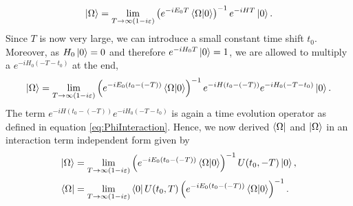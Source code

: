 \begin{equation}
    \ket{\Omega} = \lim_{T\to \infty(1-i\varepsilon)} \left( e^{-iE_0T}\braket{\Omega | 0} \right)^{-1} e^{-iHT} \ket{0}.
\end{equation}
Since $T$ is now very large, we can introduce a small constant time shift $t_0$. Moreover, as $H_0 \ket{0} = 0$ and therefore $e^{-iH_0T} \ket{0} = 1$,  we are allowed to multiply a $e^{-iH_0(-T-t_0)}$ at the end,
\begin{equation}
    \ket{\Omega} = \lim_{T\to \infty(1-i\varepsilon)} \left( e^{-iE_0(t_0-(-T))}\braket{\Omega | 0} \right)^{-1} e^{-iH(t_0 - (-T))} e^{-iH_0(-T-t_0)} \ket{0}.
\end{equation}
The term $e^{-iH(t_0 - (-T))} e^{-iH_0(-T-t_0)}$ is again a time evolution operator as defined in equation \ref{eq:PhiInteraction}. Hence, we now derived $\bra{\Omega}$ and $\ket{\Omega}$ in an interaction term independent form given by
\begin{align}\label{eq:OmegaStates}
    \ket{\Omega} &= \lim_{T\to \infty(1-i\varepsilon)} \left( e^{-iE_0(t_0-(-T))}\braket{\Omega | 0} \right)^{-1} U(t_0,-T) \ket{0}, \\ \nonumber
    \bra{\Omega} &= \lim_{T\to \infty(1-i\varepsilon)} \bra{0} U(t_0,T) \left( e^{-iE_0(t_0-(-T))}\braket{\Omega | 0} \right)^ {-1}.
\end{align}

